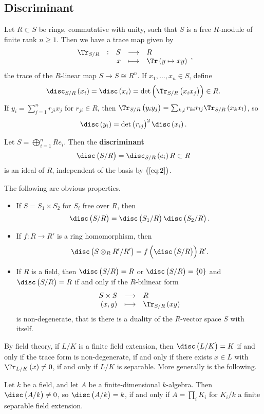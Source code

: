 \subsection{Discriminant}

Let $ R \subset S $ be rings, commutative with unity, such that $ S $ is a free $ R $-module of finite rank $ n \ge 1 $. Then we have a trace map given by
$$ \function[\Tr_{S / R}]{S}{R}{x}{\Tr\br{y \mapsto xy}}, $$
the trace of the $ R $-linear map $ S \to S \cong R^n $. If $ x_1, \dots, x_n \in S $, define
$$ \disc_{S / R} \br{x_i} = \disc \br{x_i} = \det \br{\Tr_{S / R}\br{x_ix_j}} \in R. $$
If $ y_i = \sum_{j = 1}^n r_{ji}x_j $ for $ r_{ji} \in R $, then $ \Tr_{S / R}\br{y_iy_j} = \sum_{k, l} r_{ki}r_{lj}\Tr_{S / R}\br{x_kx_l} $, so
\begin{equation}
\label{eq:2}
\disc \br{y_i} = \det \br{r_{ij}}^2 \disc \br{x_i}.
\end{equation}

\begin{definition*}
Let $ S = \bigoplus_{i = 1}^n Re_i $. Then the \textbf{discriminant}
$$ \disc\br{S / R} = \disc_{S / R} \br{e_i}R \subset R $$
is an ideal of $ R $, independent of the basis by $ \br{\ref{eq:2}} $.
\end{definition*}

The following are obvious properties.
\begin{itemize}
\item If $ S = S_1 \times S_2 $ for $ S_i $ free over $ R $, then
$$ \disc\br{S / R} = \disc\br{S_1 / R}\disc\br{S_2 / R}. $$
\item If $ f : R \to R' $ is a ring homomorphism, then
$$ \disc\br{S \otimes_R R' / R'} = f\br{\disc\br{S / R}}R'. $$
\item If $ R $ is a field, then $ \disc\br{S / R} = R $ or $ \disc\br{S / R} = \cbr{0} $ and $ \disc\br{S / R} = R $ if and only if the $ R $-bilinear form
$$ \function{S \times S}{R}{\br{x, y}}{\Tr_{S / R}\br{xy}} $$
is non-degenerate, that is there is a duality of the $ R $-vector space $ S $ with itself.
\end{itemize}
By field theory, if $ L / K $ is a finite field extension, then $ \disc\br{L / K} = K $ if and only if the trace form is non-degenerate, if and only if there exists $ x \in L $ with $ \Tr_{L / K}\br{x} \ne 0 $, if and only if $ L / K $ is separable. More generally is the following.

\begin{theorem}
\label{thm:3.1}
Let $ k $ be a field, and let $ A $ be a finite-dimensional $ k $-algebra. Then $ \disc\br{A / k} \ne 0 $, so $ \disc\br{A / k} = k $, if and only if $ A = \prod_i K_i $ for $ K_i / k $ a finite separable field extension.
\end{theorem}

